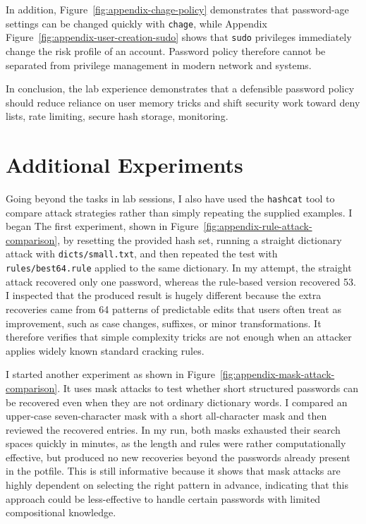 \documentclass[12pt,a4paper]{article}
\begin{document}
In addition, Figure~\ref{fig:appendix-chage-policy} demonstrates that
password-age settings can be changed quickly with \texttt{chage}, while Appendix
Figure~\ref{fig:appendix-user-creation-sudo} shows that \texttt{sudo} privileges immediately
change the risk profile of an account. Password policy therefore cannot be separated from
privilege management in modern network and systems.

In conclusion, the lab experience demonstrates that a defensible password policy should reduce reliance on user memory tricks and shift security
work toward deny lists, rate limiting, secure hash storage, monitoring.

\section{Additional Experiments}
Going beyond the tasks in lab sessions, I also have used the \texttt{hashcat} tool to compare attack
strategies rather than simply repeating the supplied examples. I began The first experiment,
shown in Figure~\ref{fig:appendix-rule-attack-comparison}, by resetting the provided hash
set, running a straight dictionary attack with \texttt{dicts/small.txt}, and then repeated the test
with \texttt{rules/best64.rule} applied to the same dictionary. In my attempt, the straight attack
recovered only one password, whereas the rule-based version recovered 53. I inspected that the produced result is
hugely different because the extra recoveries came from 64 patterns of predictable edits that users often treat as
improvement, such as case changes, suffixes, or minor transformations. It therefore verifies 
that simple complexity tricks are not enough when an attacker applies widely known standard
cracking rules. 

I started another experiment as shown in Figure~\ref{fig:appendix-mask-attack-comparison}. It uses mask attacks to test whether short
structured passwords can be recovered even when they are not ordinary dictionary words. I
compared an upper-case seven-character mask with a short all-character mask and then
reviewed the recovered entries. In my run, both masks exhausted their search spaces quickly in minutes, as the length and rules were rather computationally effective,
but produced no new recoveries beyond the passwords already present in the potfile. This is
still informative because it shows that mask attacks are highly dependent on selecting the
right pattern in advance, indicating that this approach could be less-effective to handle certain passwords with limited compositional knowledge. 
\end{document}
